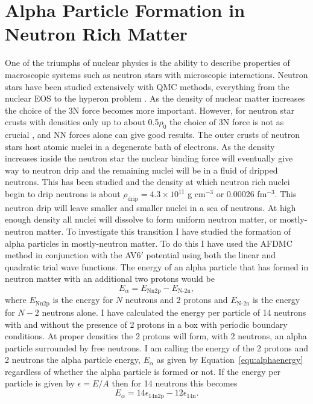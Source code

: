\section{Alpha Particle Formation in Neutron Rich Matter}
One of the triumphs of nuclear physics is the ability to describe properties of macroscopic systems such as neutron stars with microscopic interactions. Neutron stars have been studied extensively with QMC methods, everything from the nuclear EOS \cite{sarsa2003,gandolfi2014} to the hyperon problem \cite{lonardoni2015,gandolfi2018}. As the density of nuclear matter increases the choice of the 3N force becomes more important. However, for neutron star crusts with densities only up to about 0.5$\rho_0$ the choice of 3N force is not as crucial \cite{gandolfi2009}, and NN forces alone can give good results. The outer crusts of neutron stars host atomic nuclei in a degenerate bath of electrons. As the density increases inside the neutron star the nuclear binding force will eventually give way to neutron drip and the remaining nuclei will be in a fluid of dripped neutrons. This has been studied \cite{lorenz1993,chamel2015} and the density at which neutron rich nuclei begin to drip neutrons is about $\rho_\text{drip} = 4.3\times10^{11}$ g cm$^{-3}$ or 0.00026 fm$^{-3}$. This neutron drip will leave smaller and smaller nuclei in a sea of neutrons. At high enough density all nuclei will dissolve to form uniform neutron matter, or mostly-neutron matter. To investigate this transition I have studied the formation of alpha particles in mostly-neutron matter. To do this I have used the AFDMC method in conjunction with the AV6$'$ potential using both the linear and quadratic trial wave functions. The energy of an alpha particle that has formed in neutron matter with an additional two protons would be
\begin{equation}
   E_\alpha = E_\text{Nn2p} - E_\text{N-2n},
   \label{equ:alphaenergy}
\end{equation}
where $E_\text{Nn2p}$ is the energy for $N$ neutrons and 2 protons and $E_\text{N-2n}$ is the energy for $N-2$ neutrons alone. I have calculated the energy per particle of 14 neutrons with and without the presence of 2 protons in a box with periodic boundary conditions. At proper densities the 2 protons will form, with 2 neutrons, an alpha particle surrounded by free neutrons. I am calling the energy of the 2 protons and 2 neutrons the alpha particle energy, $E_\alpha$ as given by Equation~\ref{equ:alphaenergy} regardless of whether the alpha particle is formed or not. If the energy per particle is given by $\epsilon = E/A$ then for 14 neutrons this becomes
\begin{equation}
   E_\alpha = 14\epsilon_\text{14n2p} - 12\epsilon_\text{14n}.
   \label{equ:alphaenergy14n2p}
\end{equation}

